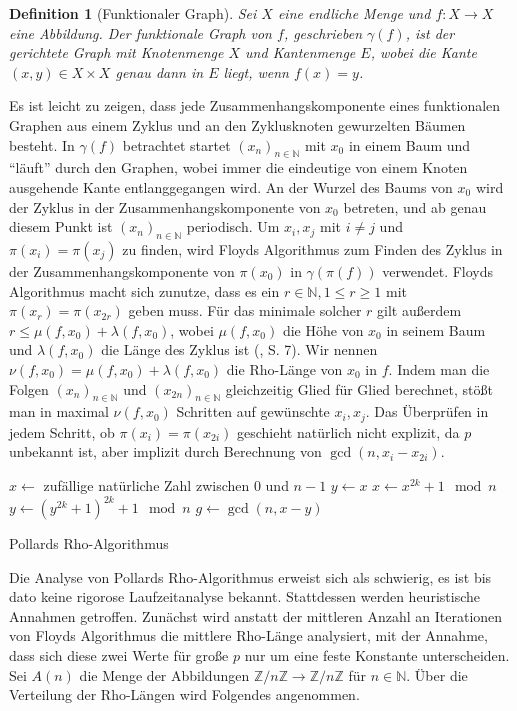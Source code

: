 \documentclass[a4paper, 10pt, ngerman]{article}
\newcommand{\N}{\mathbb{N}}
\newcommand{\Z}{\mathbb{Z}}
\newtheorem{definition}{Definition}
\begin{document}
\begin{definition}[Funktionaler Graph]
    Sei $X$ eine endliche Menge und $f: X \to X$ eine Abbildung. Der funktionale Graph von $f$, geschrieben $\gamma(f)$, ist der gerichtete Graph mit Knotenmenge $X$ und Kantenmenge $E$, wobei die Kante $(x, y) \in X \times X$ genau dann in $E$ liegt, wenn $f(x) = y$.
\end{definition}

\noindent Es ist leicht zu zeigen, dass jede Zusammenhangskomponente eines funktionalen Graphen aus einem Zyklus und an den Zyklusknoten gewurzelten Bäumen besteht. In $\gamma(f)$ betrachtet startet $(x_n)_{n \in \N}$ mit $x_0$ in einem Baum und "`läuft"' durch den Graphen, wobei immer die eindeutige von einem Knoten ausgehende Kante entlanggegangen wird. An der Wurzel des Baums von $x_0$ wird der Zyklus in der Zusammenhangskomponente von $x_0$ betreten, und ab genau diesem Punkt ist $(x_n)_{n \in \N}$ periodisch. Um $x_i, x_j$ mit $i \ne j$ und $\pi(x_i) = \pi(x_j)$ zu finden, wird Floyds Algorithmus zum Finden des Zyklus in der Zusammenhangskomponente von $\pi(x_0)$ in $\gamma(\pi(f))$ verwendet. Floyds Algorithmus macht sich zunutze, dass es ein $r \in \N, 1 \le r \ge 1$ mit $\pi(x_r) = \pi(x_{2r})$ geben muss. Für das minimale solcher $r$ gilt außerdem $r \le \mu(f, x_0) + \lambda(f, x_0)$, wobei $\mu(f, x_0)$ die Höhe von $x_0$ in seinem Baum und $\lambda(f, x_0)$ die Länge des Zyklus ist (\cite{knu98}, S. 7). Wir nennen $\nu(f, x_0) = \mu(f, x_0) + \lambda(f, x_0)$ die Rho-Länge von $x_0$ in $f$. Indem man die Folgen $(x_n)_{n \in \N}$ und $(x_{2n})_{n \in \N}$ gleichzeitig Glied für Glied berechnet, stößt man in maximal $\nu(f, x_0)$ Schritten auf gewünschte $x_i, x_j$. Das Überprüfen in jedem Schritt, ob $\pi(x_i) = \pi(x_{2i})$ geschieht natürlich nicht explizit, da $p$ unbekannt ist, aber implizit durch Berechnung von $\gcd(n, x_i - x_{2i})$.

\begin{algorithm*}
    $x \gets $ zufällige natürliche Zahl zwischen $0$ und $n - 1$ \;
    $y \gets x$ \;
    {
        $x \gets x^{2k} + 1 \mod n$ \;
        $y \gets (y^{2k} + 1)^{2k} + 1 \mod n$ \;
        $g \gets \gcd(n, x - y)$ \;
        {
             \;
        }
    }

    \caption{Pollards Rho-Algorithmus}
\end{algorithm*}

\noindent Die Analyse von Pollards Rho-Algorithmus erweist sich als schwierig, es ist bis dato keine rigorose Laufzeitanalyse bekannt. Stattdessen werden heuristische Annahmen getroffen. Zunächst wird anstatt der mittleren Anzahl an Iterationen von Floyds Algorithmus die mittlere Rho-Länge analysiert, mit der Annahme, dass sich diese zwei Werte für große $p$ nur um eine feste Konstante unterscheiden. Sei $A(n)$ die Menge der Abbildungen $\Z/n\Z \to \Z/n\Z$ für $n \in \N$. Über die Verteilung der Rho-Längen wird Folgendes angenommen.
\end{document}
